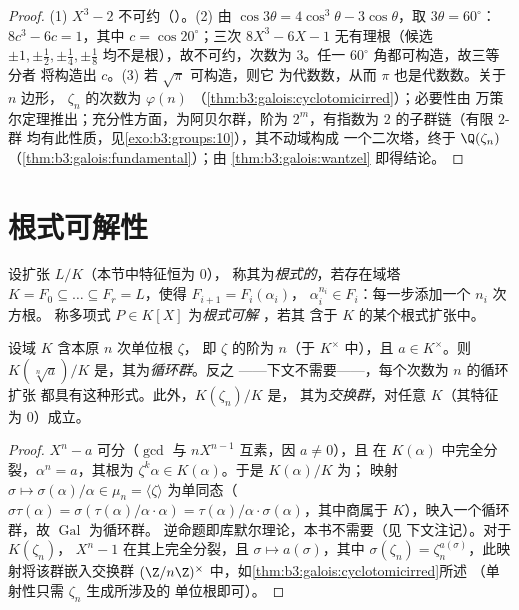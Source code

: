 \begin{proof}
(1) $X^3 - 2$ 不可约（）。(2) 由 $\cos
3\theta = 4\cos^3\theta - 3\cos\theta$，取 $3\theta =
60^\circ$：$8c^3 - 6c = 1$，其中 $c = \cos 20^\circ$；三次
$8X^3 - 6X - 1$ 无有理根（候选 $\pm1, \pm\frac
12, \pm\frac14, \pm\frac18$ 均不是根），故不可约，次数为
$3$。任一 $60^\circ$ 角都可构造，故三等分者
将构造出 $c$。(3) 若 $\sqrt\pi$ 可构造，则它
为代数数，从而 $\pi$ 也是代数数。关于 $n$ 边形，
$\zeta_n$ 的次数为 $\varphi(n)$
（\cref{thm:b3:galois:cyclotomicirred}）；必要性由
万策尔定理推出；充分性方面，为阿贝尔群，阶为
$2^m$，有指数为 $2$ 的子群链（有限 $2$-群
均有此性质，见\cref{exo:b3:groups:10}），其不动域构成
一个二次塔，终于 $\Q(\zeta_n)$
（\cref{thm:b3:galois:fundamental}）；由
\cref{thm:b3:galois:wantzel} 即得结论。
\end{proof}

\section{根式可解性}

\begin{definition}\label{def:b3:galois:radical}
设扩张 $L/K$（本节中特征恒为 $0$），
称其为\emph{根式的}，若存在域塔 $K = F_0 \subseteq \dots
\subseteq F_r = L$，使得 $F_{i+1} = F_i(\alpha_i)$，
$\alpha_i^{n_i} \in F_i$：每一步添加一个 $n_i$ 次方根。
称多项式 $P \in K[X]$ 为\emph{根式可解
}，若其
含于 $K$ 的某个根式扩张中。
\end{definition}

\begin{lemma}\label{lem:b3:galois:cyclicsteps}
设域 $K$ 含本原 $n$ 次单位根 $\zeta$，
即 $\zeta$ 的阶为 $n$（于 $K^\times$ 中），且 $a \in K^\times$。则
$K(\sqrt[n]a)/K$ 是，其为\emph{循环群}。反之
——下文不需要——，每个次数为 $n$ 的循环扩张
都具有这种形式。此外，$K(\zeta_n)/K$ 是，
其为\emph{交换群}，对任意 $K$（其特征为 $0$）成立。
\end{lemma}

\begin{proof}
$X^n - a$ 可分（$\gcd$ 与 $nX^{n-1}$ 互素，因 $a \neq 0$），且
在 $K(\alpha)$ 中完全分裂，$\alpha^n = a$，其根为
$\zeta^k\alpha \in K(\alpha)$。于是 $K(\alpha)/K$ 为；
映射 $\sigma \mapsto \sigma(\alpha)/\alpha \in \mu_n = \langle
\zeta\rangle$ 为单同态（$\sigma\tau(\alpha) =
\sigma(\tau(\alpha)/\alpha \cdot \alpha) =
\tau(\alpha)/\alpha\cdot\sigma(\alpha)$，其中商属于
$K$），映入一个循环群，故 $\operatorname{Gal}$ 为循环群。
逆命题即库默尔理论，本书不需要（见
下文注记）。对于 $K(\zeta_n)$， $X^n -
1$ 在其上完全分裂，且 $\sigma \mapsto a(\sigma)$，其中 $\sigma(\zeta_n) =
\zeta_n^{a(\sigma)}$，此映射将该群嵌入交换群
$(\Z/n\Z)^\times$ 中，如\cref{thm:b3:galois:cyclotomicirred}所述
（单射性只需 $\zeta_n$ 生成所涉及的
单位根即可）。
\end{proof}

